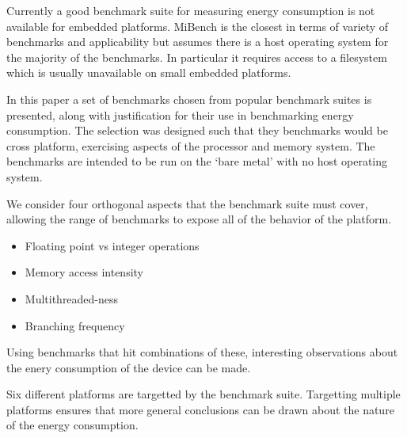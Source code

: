 \documentclass[twocolumn]{article}
\begin{document}
Currently a good benchmark suite for measuring energy consumption is not available for embedded platforms. MiBench is the closest in terms of variety of benchmarks and applicability but assumes there is a host operating system for the majority of the benchmarks. In particular it requires access to a filesystem which is usually unavailable on small embedded platforms.

In this paper a set of benchmarks chosen from popular benchmark suites is presented, along with justification for their use in benchmarking energy consumption. The selection was designed such that they benchmarks would be cross platform, exercising aspects of the processor and memory system. The benchmarks are intended to be run on the ‘bare metal’ with no host operating system.

We consider four orthogonal aspects that the benchmark suite must cover, allowing the range of benchmarks to expose all of the behavior of the platform.

\begin{itemize}
	\setlength{\itemsep}{-0.25em}
	\item Floating point vs integer operations
	\item Memory access intensity
	\item Multithreaded-ness
	\item Branching frequency
\end{itemize}

Using benchmarks that hit combinations of these, interesting observations about the enery consumption of the device can be made.

Six different platforms are targetted by the benchmark suite. Targetting multiple platforms ensures that more general conclusions can be drawn about the nature of the energy consumption.
\end{document}
